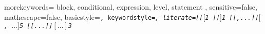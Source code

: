   {
    morekeywords={
      block,
      conditional,
      expression,
      level,
      statement
    },
    sensitive=false,
    mathescape=false,
    basicstyle=\footnotesize\tt,
    keywordstyle=\em,
    literate={[[}{{$[$}}{1}
             {]]}{{$]$}}{1}
             {[[,...]]}{{$[$, $\ldots]$}}{5}
             {[[...]]}{{$[\ldots]$}}{3}
  }


